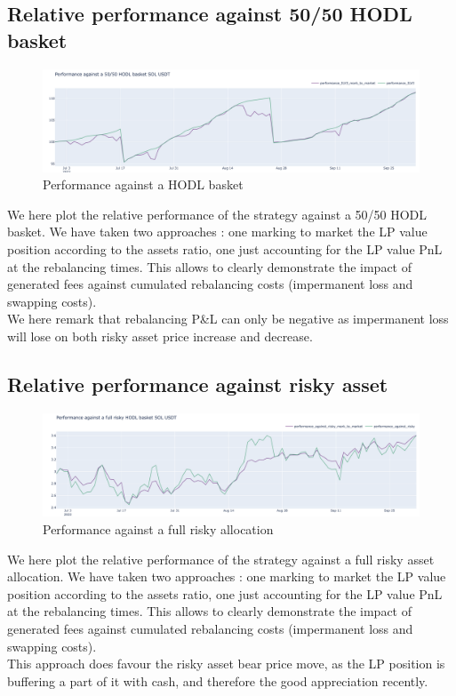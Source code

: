 \documentclass[conference]{IEEEtran}
\begin{document}
\subsection{Relative performance against 50/50 HODL basket}
\begin{figure}[h!]
    \centering
    \includegraphics[scale=0.2]{Plots/hodl.png}
    \caption{Performance against a HODL basket}
    \label{fig:conc_liquidity}
\end{figure}
We here plot the relative performance of the strategy against a 50/50 HODL basket. We have taken two approaches : one marking to market the LP value position according to the assets ratio, one just accounting for the LP value PnL at the rebalancing times. This allows to clearly demonstrate the impact of generated fees against cumulated rebalancing costs (impermanent loss and swapping costs).\\
We here remark that rebalancing P&L can only be negative as impermanent loss will lose on both risky asset price increase and decrease.
\subsection{Relative performance against risky asset}
\begin{figure}[h!]
    \centering
    \includegraphics[scale=0.2]{Plots/risky.png}
    \caption{Performance against a full risky allocation}
    \label{fig:conc_liquidity}
\end{figure}
We here plot the relative performance of the strategy against a full risky asset allocation. We have taken two approaches : one marking to market the LP value position according to the assets ratio, one just accounting for the LP value PnL at the rebalancing times. This allows to clearly demonstrate the impact of generated fees against cumulated rebalancing costs (impermanent loss and swapping costs).\\
This approach does favour the risky asset bear price move, as the LP position is buffering a part of it with cash, and therefore the good appreciation recently.\\
\end{document}

